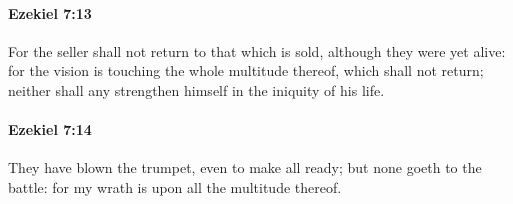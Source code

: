 		\paragraph{Ezekiel 7:13} %
			\label{EZEKIEL-7-13}

			For the seller shall not return to that which is sold, although they were yet alive: for the vision is touching the whole multitude thereof, which shall not return; neither shall any strengthen himself in the iniquity of his life.


		\paragraph{Ezekiel 7:14} %
			\label{EZEKIEL-7-14}

			They have blown the trumpet, even to make all ready; but none goeth to the battle: for my wrath is upon all the multitude thereof.


